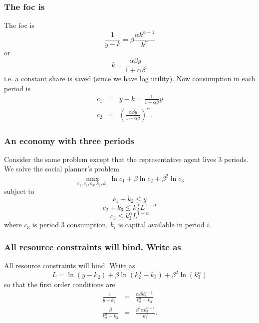 \documentclass[aspectratio=169]{ltx-talk}
\begin{document}
\begin{frame}
\frametitle{The foc is}
The foc is 
\begin{equation*}
\frac{1}{y-k}=\beta \frac{\alpha k^{\alpha -1}}{k^{\alpha }}
\end{equation*}%
or%
\begin{equation*}
k=\frac{\alpha \beta y}{1+\alpha \beta }.
\end{equation*}%
i.e. a constant share is saved (since we have log utility). Now consumption
in each period is 
\begin{eqnarray*}
c_{1} &=&y-k=\frac{1}{1+\alpha \beta }y \\
c_{2} &=&\left( \frac{\alpha \beta y}{1+\alpha \beta }\right) ^{\alpha }.
\end{eqnarray*}
\end{frame}

\begin{frame}
\frametitle{An economy with three periods}
Consider the same problem except that the representative agent lives 3
periods. We solve the social planner's problem%
\begin{equation*}
\underset{c_{1},c_{2},c_{3},k_{2},k_{3}}{\max }\ln c_{1}+\beta \ln
c_{2}+\beta ^{2}\ln c_{3}
\end{equation*}%
subject to%
\begin{equation*}
c_{1}+k_{2}\leq y
\end{equation*}%
\begin{equation*}
c_{2}+k_{3}\leq k_{2}^{\alpha }L^{1-\alpha }
\end{equation*}%
\begin{equation*}
c_{3}\leq k_{3}^{\alpha }L^{1-\alpha }
\end{equation*}%
where $c_{3}$ is period 3 consumption, $k_{i}$ is capital available in
period $i$.
\end{frame}

\begin{frame}
\frametitle{All resource constraints will bind. Write as}
All resource constraints will bind. Write as 
\begin{equation*}
L=\ln \left( y-k_{2}\right) +\beta \ln \left( k_{2}^{\alpha }-k_{3}\right)
+\beta ^{2}\ln \left( k_{3}^{\alpha }\right)
\end{equation*}%
so that the first order conditions are%
\begin{eqnarray*}
\frac{1}{y-k_{2}} &=&\frac{\alpha \beta k_{2}^{\alpha -1}}{k_{2}^{\alpha
}-k_{3}} \\
\frac{\beta }{k_{2}^{\alpha }-k_{3}} &=&\frac{\beta ^{2}\alpha k_{3}^{\alpha
-1}}{k_{3}^{\alpha }}.
\end{eqnarray*}%
\end{frame}
\end{document}
